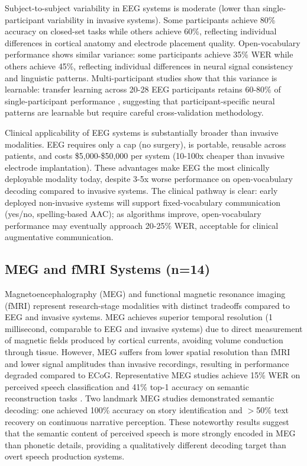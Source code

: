 Subject-to-subject variability in EEG systems is moderate (lower than single-participant variability in invasive systems). Some participants achieve 80\% accuracy on closed-set tasks while others achieve 60\%, reflecting individual differences in cortical anatomy and electrode placement quality. Open-vocabulary performance shows similar variance: some participants achieve 35\% WER while others achieve 45\%, reflecting individual differences in neural signal consistency and linguistic patterns. Multi-participant studies show that this variance is learnable: transfer learning across 20-28 EEG participants retains 60-80\% of single-participant performance \cite{Peterson2021}, suggesting that participant-specific neural patterns are learnable but require careful cross-validation methodology.

Clinical applicability of EEG systems is substantially broader than invasive modalities. EEG requires only a cap (no surgery), is portable, reusable across patients, and costs \$5,000-\$50,000 per system \cite{Vansteensel2023} (10-100x cheaper than invasive electrode implantation). These advantages make EEG the most clinically deployable modality today, despite 3-5x worse performance on open-vocabulary decoding compared to invasive systems. The clinical pathway is clear: early deployed non-invasive systems will support fixed-vocabulary communication (yes/no, spelling-based AAC); as algorithms improve, open-vocabulary performance may eventually approach 20-25\% WER, acceptable for clinical augmentative communication.

\subsection{MEG and fMRI Systems (n=14)}

Magnetoencephalography (MEG) and functional magnetic resonance imaging (fMRI) represent research-stage modalities with distinct tradeoffs compared to EEG and invasive systems. MEG achieves superior temporal resolution (1 millisecond, comparable to EEG and invasive systems) due to direct measurement of magnetic fields produced by cortical currents, avoiding volume conduction through tissue. However, MEG suffers from lower spatial resolution than fMRI and lower signal amplitudes than invasive recordings, resulting in performance degraded compared to ECoG. Representative MEG studies achieve 15\% WER on perceived speech classification and 41\% top-1 accuracy on semantic reconstruction tasks \cite{Tang2023Semantic}. Two landmark MEG studies demonstrated semantic decoding: one achieved 100\% accuracy on story identification and $>$50\% text recovery on continuous narrative perception. These noteworthy results suggest that the semantic content of perceived speech is more strongly encoded in MEG than phonetic details, providing a qualitatively different decoding target than overt speech production systems.

